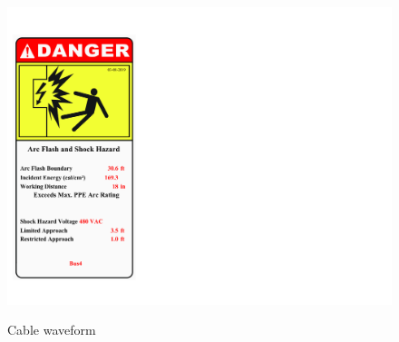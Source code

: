 \begin{figure}
	\includegraphics[scale=0.5]{figures/ARC1_3_5X7_Danger1_Bus.pdf} \\
	\caption{Cable waveform}
	\label{fig_ch04_elecaudit_arflashlable} 
\end{figure}


